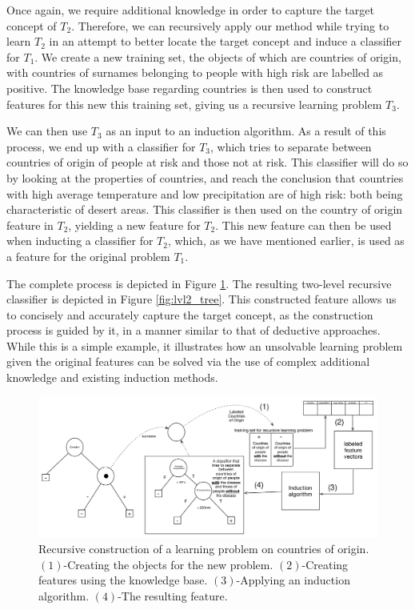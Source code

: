 \documentclass{article}
\theoremstyle{definition}
\begin{document}
Once again, we require additional knowledge in order to capture the target concept of $T_2$. 
Therefore, we can recursively apply our method while trying to learn $T_2$ in an attempt to better locate the target concept and induce a classifier for $T_1$.
We create a new training set, the objects of which are countries of origin, with countries of surnames belonging to people with high risk are labelled as positive. The knowledge base regarding countries is then used to construct features for this new this training set, giving us a recursive learning problem $T_3$.

We can then use $T_3$ as an input to an induction algorithm. As a result of this process, we end up with a classifier for $T_3$, which tries to separate between countries of origin of people at risk and those not at risk. This classifier will do so by looking at the properties of countries, and reach the conclusion that countries with high average temperature and low precipitation are of high risk: both being characteristic of desert areas.
This classifier is then used on the country of origin feature in $T_2$, yielding a new feature for $T_2$.  This new feature can then be used when inducting a classifier for $T_2$, which, as we have mentioned earlier, is used as a feature for the original problem $T_1$.

The complete process is depicted in Figure \ref{fig:moving_to_lvl2}. The resulting two-level recursive classifier is depicted in Figure \ref{fig:lvl2_tree}. This constructed feature allows us to concisely and accurately capture the target concept, as the construction process is guided by it, in a manner similar to that of deductive approaches.
While this is a simple example, it illustrates how an unsolvable learning problem given the original features can be solved via the use of complex additional knowledge and existing induction methods.


\begin{figure}[th]
	\centering
	\includegraphics[width=\linewidth]{fig4_annotated.pdf}
	\caption{Recursive construction of a learning problem on countries of origin. $(1)$-Creating the objects for the new problem. $(2)$-Creating features using the knowledge base. $(3)$-Applying an induction algorithm. $(4)$-The resulting feature.}
	\label{fig:moving_to_lvl2}
\end{figure}
\end{document}
